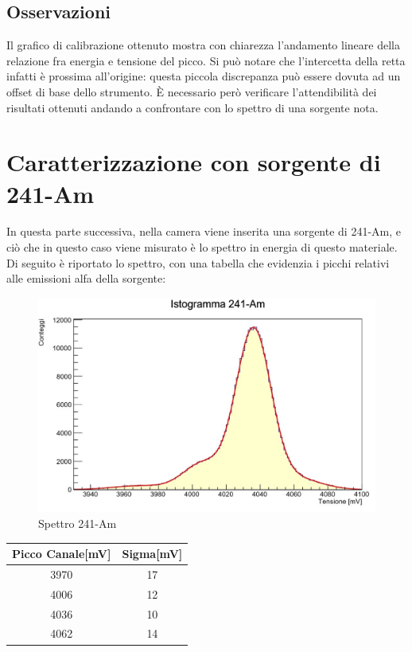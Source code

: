 \documentclass[a4paper,10pt]{article}
\begin{document}
\subsection{Osservazioni}
Il grafico di calibrazione ottenuto mostra con chiarezza l'andamento lineare della relazione fra energia e tensione del picco. Si pu\`o notare che l'intercetta della retta infatti \`e prossima all'origine: questa piccola discrepanza può essere dovuta ad un offset di base dello strumento. 
\`E necessario però verificare l'attendibilit\`a dei risultati ottenuti andando a confrontare con lo spettro di una sorgente nota.
\section{Caratterizzazione con sorgente di 241-Am}
In questa parte successiva, nella camera viene inserita una sorgente di 241-Am, e ci\`o che in questo caso viene misurato \`e lo spettro in energia di questo materiale. Di seguito \`e riportato lo spettro, con una tabella che evidenzia i picchi relativi alle emissioni alfa della sorgente:\\

\begin{figure}[h!]
\centering
\includegraphics[scale=0.5]{istoame.jpg}
\caption{Spettro 241-Am}
\end{figure}

\begin{center}
\begin{tabular}{cc}
\toprule
Picco Canale[mV] & Sigma[mV] \\
\midrule
3970 & 17\\
4006 & 12\\
4036 & 10\\
4062 & 14\\
\bottomrule
\end{tabular}\\
\end{center}
\end{document}
